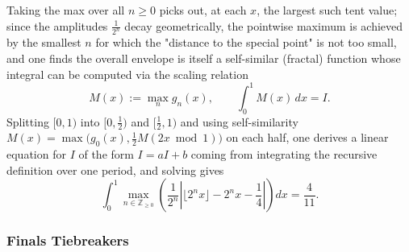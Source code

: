 \begin{questions}
\begin{solution}
Taking the max over all $n\ge0$ picks out, at each $x$, the largest such tent value; since the amplitudes $\frac{1}{2^n}$ decay geometrically, the pointwise maximum is achieved by the smallest $n$ for which the "distance to the special point" is not too small, and one finds the overall envelope is itself a self-similar (fractal) function whose integral can be computed via the scaling relation
\[
M(x):=\max_n g_n(x),\qquad \int_0^1 M(x)\,dx = I.
\]
Splitting $[0,1)$ into $[0,\tfrac12)$ and $[\tfrac12,1)$ and using self-similarity $M(x)=\max\big(g_0(x),\tfrac12 M(2x\bmod1)\big)$ on each half, one derives a linear equation for $I$ of the form $I=aI+b$ coming from integrating the recursive definition over one period, and solving gives
\[
\int_0^1 \max_{n\in\mathbb{Z}_{\ge0}}\left(\frac{1}{2^n}\left|\lfloor 2^n x\rfloor - 2^n x-\frac14\right|\right)dx=\frac{4}{11}.
\]
\end{solution}
 
\end{questions}
 
\subsubsection*{Finals Tiebreakers}
 
